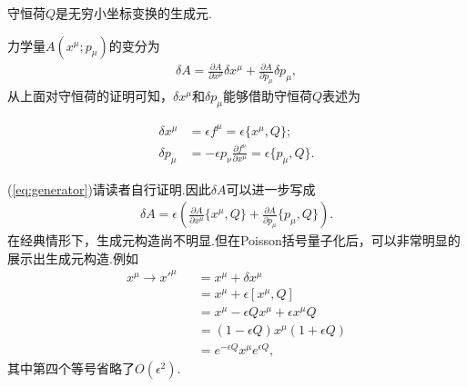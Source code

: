 		\begin{theorem}
		守恒荷$Q$是无穷小坐标变换的生成元.
		\end{theorem}
	
		力学量$A(x^\mu;p_\mu)$的变分为
		\begin{eqnarray*}
		\delta A=\frac{\partial A}{\partial x^\mu}\delta x^\mu+\frac{\partial A}{\partial p_\mu}\delta p_\mu,
		\end{eqnarray*}
		从上面对守恒荷的证明可知，$\delta x^\mu$和$\delta p_\mu$能够借助守恒荷$Q$表述为
		\begin{exercise}
			\begin{equation}\label{eq:generator}
				\begin{split}
					\delta x^\mu&=\epsilon f^\mu=\epsilon\{x^\mu,Q\};\\
					\delta p_\mu&=-\epsilon p_\nu\frac{\partial f^\nu}{\partial x^\mu}=\epsilon\{p_\mu,Q\}.
				\end{split}
			\end{equation}
		\end{exercise}
		
		(\ref{eq:generator})请读者自行证明.因此$\delta A$可以进一步写成
		\begin{eqnarray*}
		\delta A=\epsilon\left(\frac{\partial A}{\partial x^\mu}\{x^\mu,Q\}+\frac{\partial A}{\partial p_\mu}\{p_\mu,Q\}\right).
		\end{eqnarray*}
		在经典情形下，生成元构造尚不明显.但在Poisson括号量子化后，可以非常明显的展示出生成元构造.例如
		\begin{eqnarray*}
		x^\mu\rightarrow x'^\mu&&=x^\mu+\delta x^\mu\\
		&&=x^\mu+\epsilon[x^\mu,Q]\\
		&&=x^\mu-\epsilon Qx^\mu+\epsilon x^\mu Q\\
		&&=\left(1-\epsilon Q\right)x^\mu\left(1+\epsilon Q\right)\\
		&&=e^{-\epsilon Q}x^\mu e^{\epsilon Q},
		\end{eqnarray*}
		其中第四个等号省略了$O(\epsilon^2)$.
	\newpage